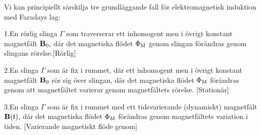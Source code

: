 {{{{\noindent
Vi kan principiellt s{\"a}rskilja tre grundl{\"a}ggande fall f{\"o}r
elektromagnetisk induktion med Faradays lag:
\medskip
\item{1.}{En r{\"o}rlig slinga $\Gamma$ som traverserar ett inhomogent men
  i {\"o}vrigt konstant magnetf{\"a}lt ${\bf B}_0$, d{\"a}r det magnetiska
  fl{\"o}det $\Phi_{\rm M}$ genom slingan f{\"o}r{\"a}ndras genom slingans
  r{\"o}relse.[R{\"o}rlig]}
\item{2.}{En slinga $\Gamma$ som {\"a}r fix i rummet, d{\"a}r ett inhomogent
  men i {\"o}vrigt konstant magnetf{\"a}lt ${\bf B}_0$ r{\"o}r sig {\"o}ver
  slingan, d{\"a}r det magnetiska fl{\"o}det $\Phi_{\rm M}$ f{\"o}r{\"a}ndras
  genom att magnetf{\"a}ltet varierar genom magnetf{\"a}ltets r{\"o}relse.
  [Station{\"a}r]}
\item{3.}{En slinga $\Gamma$ som {\"a}r fix i rummet med ett tidsvarierande
  (dynamiskt) magnetf{\"a}lt ${\bf B}(t)$, d{\"a}r det magnetiska fl{\"o}det
  $\Phi_{\rm M}$ f{\"o}r{\"a}ndras genom magnetf{\"a}ltets variation i tiden.
  [Varierande magnetiskt fl{\"o}de genom]}
\vfill\eject

}}}}
